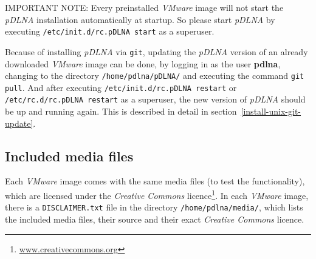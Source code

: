\documentclass[a4paper,oneside,10pt]{report}
\newenvironment{colframeimportantnote}{%
  \begin{Sbox}
    \begin{minipage}{.99\columnwidth}
}{%
  \end{minipage}
  \end{Sbox}
  \begin{center}
    \fcolorbox{black}{Orange}{\TheSbox}
  \end{center}
}
\begin{document}
\begin{colframeimportantnote}
\textsc{IMPORTANT NOTE:} Every preinstalled {\em VMware} image will not start the {\em pDLNA} installation automatically at startup. So please start {\em pDLNA} by executing \verb|/etc/init.d/rc.pDLNA start| as a superuser.
\end{colframeimportantnote}

Because of installing {\em pDLNA} via \verb|git|, updating the {\em pDLNA} version of an already downloaded {\em VMware} image can be done, by logging in as the user \textbf{pdlna}, changing to the directory \verb|/home/pdlna/pDLNA/| and executing the command \verb|git pull|. And after executing \verb|/etc/init.d/rc.pDLNA restart| or \verb|/etc/rc.d/rc.pDLNA restart| as a superuser, the new version of {\em pDLNA} should be up and running again. This is described in detail in section~\ref{install-unix-git-update}.

\subsection{Included media files}

Each {\em VMware} image comes with the same media files (to test the functionality), which are licensed under the {\em Creative Commons} licence\footnote{\url{www.creativecommons.org}}. In each {\em VMware} image, there is a \verb|DISCLAIMER.txt| file in the directory \verb|/home/pdlna/media/|, which lists the included media files, their source and their exact {\em Creative Commons} licence.
\end{document}
